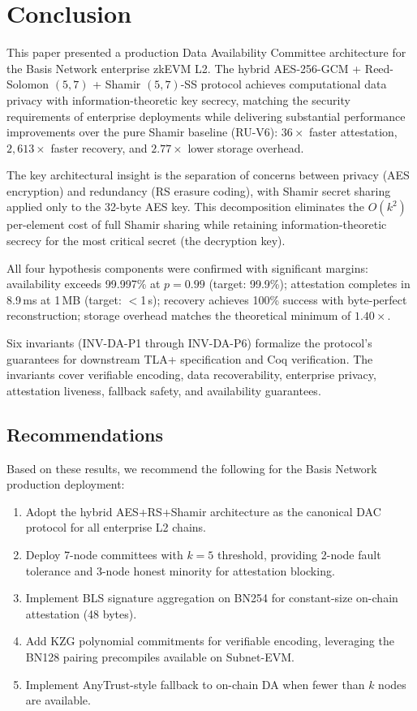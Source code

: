 
\section{Conclusion}
\label{sec:conclusion}

This paper presented a production Data Availability Committee
architecture for the Basis Network enterprise zkEVM L2. The hybrid
AES-256-GCM + Reed-Solomon $(5,7)$ + Shamir $(5,7)$-SS protocol
achieves computational data privacy with information-theoretic key
secrecy, matching the security requirements of enterprise deployments
while delivering substantial performance improvements over the pure
Shamir baseline (RU-V6): $36\times$ faster attestation, $2{,}613\times$
faster recovery, and $2.77\times$ lower storage overhead.

The key architectural insight is the separation of concerns between
privacy (AES encryption) and redundancy (RS erasure coding), with Shamir
secret sharing applied only to the 32-byte AES key. This decomposition
eliminates the $O(k^2)$ per-element cost of full Shamir sharing while
retaining information-theoretic secrecy for the most critical secret
(the decryption key).

All four hypothesis components were confirmed with significant margins:
availability exceeds 99.997\% at $p = 0.99$ (target: 99.9\%);
attestation completes in 8.9\,ms at 1\,MB (target: $<$1\,s); recovery
achieves 100\% success with byte-perfect reconstruction; storage
overhead matches the theoretical minimum of $1.40\times$.

Six invariants (INV-DA-P1 through INV-DA-P6) formalize the protocol's
guarantees for downstream TLA+ specification and Coq verification.
The invariants cover verifiable encoding, data recoverability,
enterprise privacy, attestation liveness, fallback safety, and
availability guarantees.

\subsection{Recommendations}

Based on these results, we recommend the following for the Basis Network
production deployment:

\begin{enumerate}
  \item Adopt the hybrid AES+RS+Shamir architecture as the canonical
    DAC protocol for all enterprise L2 chains.
  \item Deploy 7-node committees with $k = 5$ threshold, providing
    2-node fault tolerance and 3-node honest minority for attestation
    blocking.
  \item Implement BLS signature aggregation on BN254 for constant-size
    on-chain attestation (48 bytes).
  \item Add KZG polynomial commitments for verifiable encoding,
    leveraging the BN128 pairing precompiles available on Subnet-EVM.
  \item Implement AnyTrust-style fallback to on-chain DA when fewer than
    $k$ nodes are available.
\end{enumerate}

